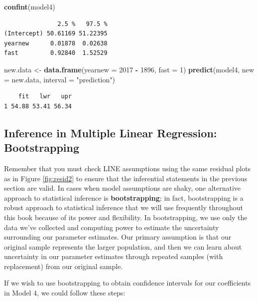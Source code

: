 \documentclass[
]{krantz}
\newenvironment{Shaded}{\begin{snugshade}}{\end{snugshade}}
\newcommand{\AttributeTok}[1]{\textcolor[rgb]{0.27,0.27,0.27}{#1}}
\newcommand{\DecValTok}[1]{\textcolor[rgb]{0.06,0.06,0.06}{#1}}
\newcommand{\FunctionTok}[1]{\textcolor[rgb]{0.27,0.27,0.27}{\textbf{#1}}}
\newcommand{\NormalTok}[1]{#1}
\newcommand{\OtherTok}[1]{\textcolor[rgb]{0.37,0.37,0.37}{#1}}
\newcommand{\SpecialCharTok}[1]{\textcolor[rgb]{0.43,0.43,0.43}{\textbf{#1}}}
\newcommand{\StringTok}[1]{\textcolor[rgb]{0.5,0.5,0.5}{#1}}
\begin{document}
\begin{Shaded}
\begin{Highlighting}[]
\FunctionTok{confint}\NormalTok{(model4)}
\end{Highlighting}
\end{Shaded}

\begin{verbatim}
               2.5 %   97.5 %
(Intercept) 50.61169 51.22395
yearnew      0.01878  0.02638
fast         0.92840  1.52529
\end{verbatim}

\begin{Shaded}
\begin{Highlighting}[]
\NormalTok{new.data }\OtherTok{\textless{}{-}} \FunctionTok{data.frame}\NormalTok{(}\AttributeTok{yearnew =} \DecValTok{2017} \SpecialCharTok{{-}} \DecValTok{1896}\NormalTok{, }\AttributeTok{fast =} \DecValTok{1}\NormalTok{) }
\FunctionTok{predict}\NormalTok{(model4, }\AttributeTok{new =}\NormalTok{ new.data, }\AttributeTok{interval =} \StringTok{"prediction"}\NormalTok{)}
\end{Highlighting}
\end{Shaded}

\begin{verbatim}
    fit   lwr   upr
1 54.88 53.41 56.34
\end{verbatim}

\subsection{Inference in Multiple Linear Regression: Bootstrapping}\label{multreg-boot}

Remember that you must check LINE assumptions using the same residual plots as in Figure \ref{fig:resid2} to ensure that the inferential statements in the previous section are valid. In cases when model assumptions are shaky, one alternative approach to statistical inference is \textbf{bootstrapping};  in fact, bootstrapping is a robust approach to statistical inference that we will use frequently throughout this book because of its power and flexibility. In bootstrapping, we use only the data we've collected and computing power to estimate the uncertainty surrounding our parameter estimates. Our primary assumption is that our original sample represents the larger population, and then we can learn about uncertainty in our parameter estimates through repeated samples (with replacement) from our original sample.

If we wish to use bootstrapping to obtain confidence intervals for our coefficients in Model 4, we could follow these steps:
\end{document}
